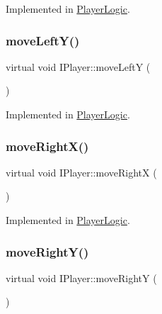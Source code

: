 Implemented in \hyperlink{class_player_logic_ac4d252e80757e05b5799ab689ee27d5e}{Player\+Logic}.

\mbox{\label{class_i_player_ab4a195d99869ef7628e923e433fc8264}} 
\subsubsection{\texorpdfstring{move\+Left\+Y()}{moveLeftY()}}
{\footnotesize\ttfamily virtual void I\+Player\+::move\+LeftY (\begin{DoxyParamCaption}{ }\end{DoxyParamCaption})\hspace{0.3cm}{\ttfamily [pure virtual]}}



Implemented in \hyperlink{class_player_logic_a006a7633ae5839d307bb90099f9d2745}{Player\+Logic}.

\mbox{\label{class_i_player_a59f3be9939ee5406cb215845b6cf00c4}} 
\subsubsection{\texorpdfstring{move\+Right\+X()}{moveRightX()}}
{\footnotesize\ttfamily virtual void I\+Player\+::move\+RightX (\begin{DoxyParamCaption}{ }\end{DoxyParamCaption})\hspace{0.3cm}{\ttfamily [pure virtual]}}



Implemented in \hyperlink{class_player_logic_a9c96291506bb5347f2c503bba4100fd4}{Player\+Logic}.

\mbox{\label{class_i_player_ae0c49a2900ebbfa951f24bc1bf4bb382}} 
\subsubsection{\texorpdfstring{move\+Right\+Y()}{moveRightY()}}
{\footnotesize\ttfamily virtual void I\+Player\+::move\+RightY (\begin{DoxyParamCaption}{ }\end{DoxyParamCaption})\hspace{0.3cm}{\ttfamily [pure virtual]}}



